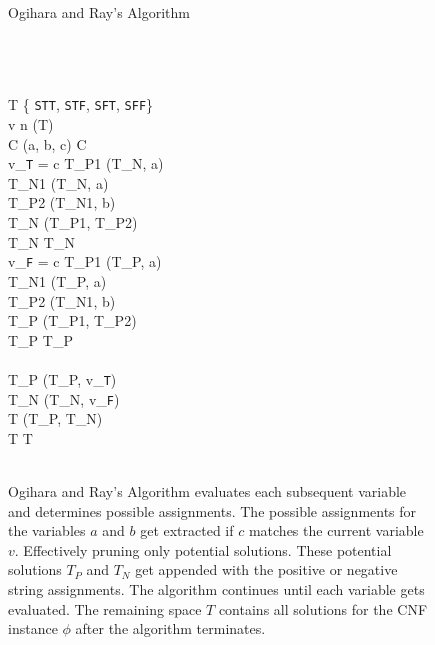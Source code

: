 
\begin{figure}[htbp]
	\renewcommand{\figurename}{Algorithm}
	\renewcommand{\thepseudocode}{\ref{ogiharaRayAlgorithm}}
	
	\begin{center}

	\begin{pseudocode}[shadowbox]{Ogihara and Ray's Algorithm}{\phi}
	
	\\
	\\
	\\
	T \GETS \{ \texttt{STT}, \texttt{STF}, \texttt{SFT},  \texttt{SFF}\} \\
	
	\FOR v   n \DO
		\BEGIN
		[T_P, T_N] \GETS {}(T)\\
	
		\FOREACH {} C  \phi \DO
			\BEGIN
				(a, b, c) \GETS C\\
				\IF v_{\texttt{T}} = c  \THEN
					\BEGIN
						T_{P1} \GETS {}(T_N, a)\\
						T_{N1} \GETS {}(T_N, \neg a)\\				
						T_{P2} \GETS {}(T_{N1}, b)\\
						T_{N} \GETS {}(T_{P1}, T_{P2})\\
						T_{N} \GETS {}T_{N}\text{)}					
					\END \\  
				\IF v_{\texttt{F}} = c \THEN
					\BEGIN
						T_{P1} \GETS {}(T_P, a)\\
						T_{N1} \GETS {}(T_P, \neg a)\\				
						T_{P2} \GETS {}(T_{N1}, b)\\
						T_{P} \GETS {}(T_{P1}, T_{P2})\\
						T_{P} \GETS {}T_{P}\text{)} 						
					\END\\
			\END\\
			T_P \GETS {}(T_P, v_{\texttt{T}})\\
			T_N \GETS {}(T_N, v_{\texttt{F}})\\
			T \GETS {}(T_P, T_N)\\
			T \GETS {}T\text{)} \\									
		\END\\
	\end{pseudocode}

\caption{{\sc Ogihara and Ray's Algorithm} evaluates each subsequent variable and determines possible assignments.  The possible assignments for the variables $a$ and $b$ get extracted if $c$ matches the current variable $v$.  Effectively pruning only potential solutions.  These potential solutions $T_P$ and $T_N$ get appended with the positive or negative string assignments.  The algorithm continues until each variable gets evaluated.  The remaining space $T$ contains all solutions for the CNF instance $\phi$ after the algorithm terminates.}
\label{ogiharaRayAlgorithm}
\end{center}
\end{figure}
